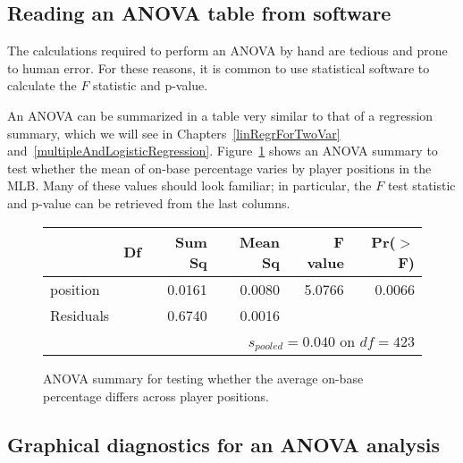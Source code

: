 \subsection{Reading an ANOVA table from software}

The calculations required to perform an ANOVA by hand are
tedious and prone to human error.
For these reasons, it is common to use statistical software
to calculate the $F$ statistic and p-value.

An ANOVA can be summarized in a table very similar to that
of a regression summary, which we will see in
Chapters~\ref{linRegrForTwoVar}
and~\ref{multipleAndLogisticRegression}.
Figure~\ref{anovaSummaryTableForOBPAgainstPosition}
shows an ANOVA summary to test whether the mean of on-base
percentage varies by player positions in the MLB.
Many of these values should look familiar;
in particular, the $F$ test statistic and p-value
can be retrieved from the last columns.

\begin{figure}[ht]
\centering
\begin{tabular}{lrrrrr}
  \hline
  & Df & Sum Sq & Mean Sq & F value & Pr($>$F) \\ 
  \hline
  position & \mlbDFA{} & 0.0161 & 0.0080 & 5.0766 & 0.0066 \\ 
  Residuals & \mlbDFB{} & 0.6740 & 0.0016 &  &  \\ 

  \hline
\multicolumn{6}{r}{$s_{pooled} = 0.040$ on $df = 423$}
\end{tabular}
\caption{ANOVA summary for testing whether the average
    on-base percentage differs across player positions.}
\label{anovaSummaryTableForOBPAgainstPosition}
\end{figure}


\D{\newpage}

\subsection{Graphical diagnostics for an ANOVA analysis}

